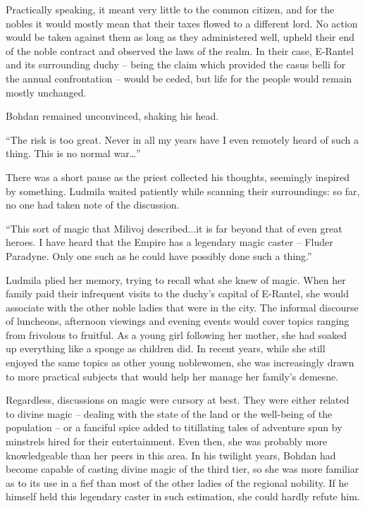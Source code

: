  

Practically speaking, it meant very little to the common citizen, and for the nobles it would mostly mean that their taxes flowed to a different lord. No action would be taken against them as long as they administered well, upheld their end of the noble contract and observed the laws of the realm. In their case, E-Rantel and its surrounding duchy – being the claim which provided the casus belli for the annual confrontation – would be ceded, but life for the people would remain mostly unchanged.

 

Bohdan remained unconvinced, shaking his head.

 

“The risk is too great. Never in all my years have I even remotely heard of such a thing. This is no normal war…”

 

There was a short pause as the priest collected his thoughts, seemingly inspired by something. Ludmila waited patiently while scanning their surroundings: so far, no one had taken note of the discussion.

 

“This sort of magic that Milivoj described...it is far beyond that of even great heroes. I have heard that the Empire has a legendary magic caster – Fluder Paradyne. Only one such as he could have possibly done such a thing.”

 

Ludmila plied her memory, trying to recall what she knew of magic. When her family paid their infrequent visits to the duchy's capital of E-Rantel, she would associate with the other noble ladies that were in the city. The informal discourse of luncheons, afternoon viewings and evening events would cover topics ranging from frivolous to fruitful. As a young girl following her mother, she had soaked up everything like a sponge as children did. In recent years, while she still enjoyed the same topics as other young noblewomen, she was increasingly drawn to more practical subjects that would help her manage her family’s demesne.

 

Regardless, discussions on magic were cursory at best. They were either related to divine magic – dealing with the state of the land or the well-being of the population – or a fanciful spice added to titillating tales of adventure spun by minstrels hired for their entertainment. Even then, she was probably more knowledgeable than her peers in this area. In his twilight years, Bohdan had become capable of casting divine magic of the third tier, so she was more familiar as to its use in a fief than most of the other ladies of the regional nobility. If he himself held this legendary caster in such estimation, she could hardly refute him.

